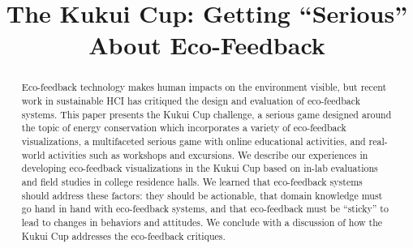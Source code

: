 \documentclass{sigchi}
\begin{document}
\title{The Kukui Cup: Getting ``Serious'' About Eco-Feedback}



\maketitle

\begin{abstract}
Eco-feedback technology makes human impacts on the environment visible, but recent work in sustainable HCI has critiqued the design and evaluation of eco-feedback systems. This paper presents the Kukui Cup challenge, a serious game designed around the topic of energy conservation which incorporates a variety of eco-feedback visualizations, a multifaceted serious game with online educational activities, and real-world activities such as workshops and excursions. We describe our experiences in developing eco-feedback visualizations in the Kukui Cup based on in-lab evaluations and field studies in college residence halls. We learned that eco-feedback systems should address these factors: they should be actionable, that domain knowledge must go hand in hand with eco-feedback systems, and that eco-feedback must be ``sticky'' to lead to changes in behaviors and attitudes. We conclude with a discussion of how the Kukui Cup addresses the eco-feedback critiques.
\end{abstract}



\end{document}
